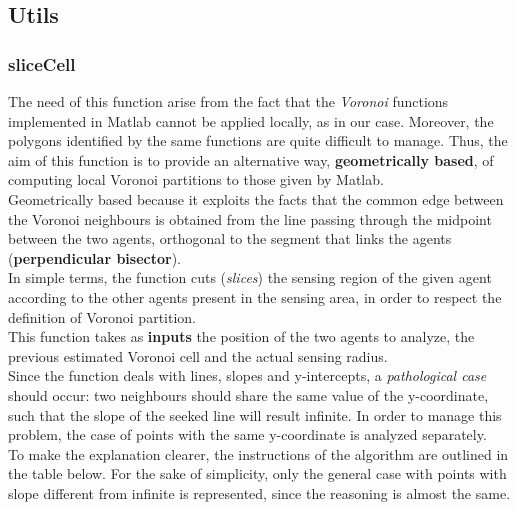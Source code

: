 \documentclass[a4paper,11pt,oneside]{book}
\begin{document}
\subsection{Utils}
\subsubsection{sliceCell}
	The need of this function arise from the fact that the \emph{Voronoi} functions implemented in Matlab cannot be applied locally, as in our case. Moreover, the polygons identified by the same functions are quite difficult to manage. Thus, the aim of this function is to provide an alternative way, \textbf{geometrically based}, of computing local Voronoi partitions to those given by Matlab.\\
	Geometrically based because it exploits the facts that the common edge between the Voronoi neighbours is obtained from the line passing through the midpoint between the two agents, orthogonal to the segment that links the agents (\textbf{perpendicular bisector}).\\
	In simple terms, the function cuts (\emph{slices}) the sensing region of the given agent according to the other agents present in the sensing area, in order to respect the definition of Voronoi partition.\\
	This function takes as \textbf{inputs} the position of the two agents to analyze, the previous estimated Voronoi cell and the actual sensing radius.\\
	Since the function deals with lines, slopes and y-intercepts, a \emph{pathological case} should occur: two neighbours should share the same value of the y-coordinate, such that the slope of the seeked line will result infinite. In order to manage this problem, the case of points with the same y-coordinate is analyzed separately.\\
	To make the explanation clearer, the instructions of the algorithm are outlined in the table below. For the sake of simplicity, only the general case with points with slope different from infinite is represented, since the reasoning is almost the same.
	
\end{document}
